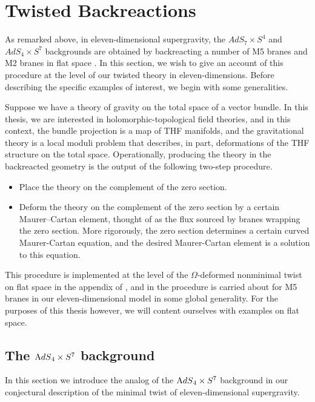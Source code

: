 \section{Twisted Backreactions}
\label{sec:ads}

As remarked above, in eleven-dimensional supergravity, the $AdS_7 \times S^4$ and $AdS_4\times S^7$ backgrounds are obtained by backreacting a number of M5 branes and M2 branes in flat space \cite{Maldacena:1997re,WittenAdS}. In this section, we wish to give an account of this procedure at the level of our twisted theory in eleven-dimensions. Before describing the specific examples of interest, we begin with some generalities.

Suppose we have a theory of gravity on the total space of a vector bundle. In this thesis, we are interested in holomorphic-topological field theories, and in this context, the bundle projection is a map of THF manifolds, and the gravitational theory is a local moduli problem that describes, in part, deformations of the THF structure on the total space. Operationally, producing the theory in the backreacted geometry is the output of the following two-step procedure. 

\begin{itemize}
  \item Place the theory on the complement of the zero section. 
  \item Deform the theory on the complement of the zero section by a certain Maurer--Cartan element, thought of as the flux sourced by branes wrapping the zero section. More rigorously, the zero section determines a certain curved Maurer-Cartan equation, and the desired Maurer-Cartan element is a solution to this equation. 
\end{itemize}

This procedure is implemented at the level of the $\Omega$-deformed nonminimal twist on flat space in the appendix of \cite{CostelloM5}, and in \cite{raghavendran2022holographic} the procedure is carried about for M5 branes in our eleven-dimensional model in some global generality. For the purposes of this thesis however, we will content ourselves with examples on flat space. 

\subsection{The ${\mathrm{A}dS}_4 \times S^7$ background}

In this section we introduce the analog of the ${\mathrm{A}dS}_4 \times S^7$ background in our conjectural description of the minimal twist of eleven-dimensional supergravity. 


